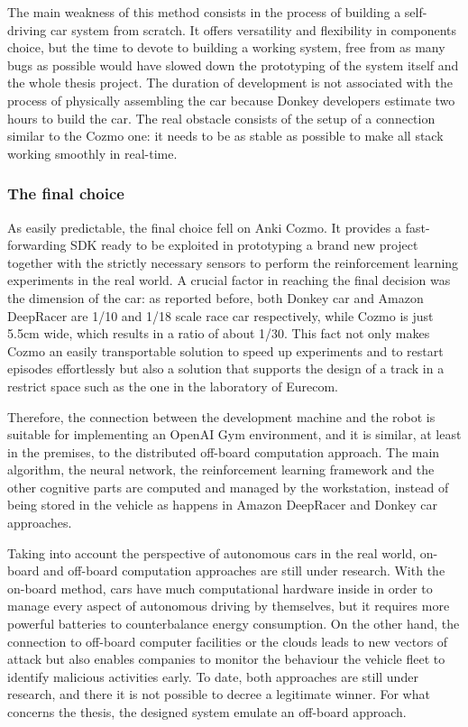 The main weakness of this method consists in the process of building a self-driving car system from scratch. It offers versatility and flexibility in components choice, but the time to devote to building a working system, free from as many bugs as possible would have slowed down the prototyping of the system itself and the whole thesis project. The duration of development is not associated with the process of physically assembling the car because Donkey developers estimate two hours to build the car. The real obstacle consists of the setup of a connection similar to the Cozmo one: it needs to be as stable as possible to make all stack working smoothly in real-time.  

\subsubsection{The final choice}

As easily predictable, the final choice fell on Anki Cozmo. It provides a fast-forwarding SDK ready to be exploited in prototyping a brand new project together with the strictly necessary sensors to perform the reinforcement learning experiments in the real world.
A crucial factor in reaching the final decision was the dimension of the car: as reported before, both Donkey car and Amazon DeepRacer are 1/10 and 1/18 scale race car respectively, while Cozmo is just 5.5cm wide, which results in a ratio of about 1/30. This fact not only makes Cozmo an easily transportable solution to speed up experiments and to restart episodes effortlessly but also a solution that supports the design of a track in a restrict space such as the one in the laboratory of Eurecom.

Therefore, the connection between the development machine and the robot is suitable for implementing an OpenAI Gym environment, and it is similar, at least in the premises, to the distributed off-board computation approach. The main algorithm, the neural network, the reinforcement learning framework and the other cognitive parts are computed and managed by the workstation, instead of being stored in the vehicle as happens in Amazon DeepRacer and Donkey car approaches.

Taking into account the perspective of autonomous cars in the real world, on-board and off-board computation approaches are still under research. With the on-board method, cars have much computational hardware inside in order to manage every aspect of autonomous driving by themselves, but it requires more powerful batteries to counterbalance energy consumption. On the other hand, the connection to off-board computer facilities or the clouds leads to new vectors of attack but also enables companies to monitor the behaviour the vehicle fleet to identify malicious activities early.
To date, both approaches are still under research, and there it is not possible to decree a legitimate winner. For what concerns the thesis, the designed system emulate an off-board approach.

